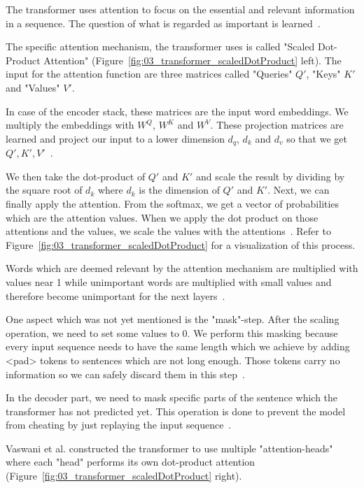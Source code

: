 The transformer uses attention to focus on the essential and relevant information in a sequence. The question of what is regarded as important is learned~\cite{Vaswani2017d}.

The specific attention mechanism, the transformer uses is called "Scaled Dot-Product Attention" {(Figure~\ref{fig:03_transformer_scaledDotProduct} left)}. The input for the attention function are three matrices called "Queries" $Q'$, "Keys" $K'$ and "Values" $V'$.

In case of the encoder stack, these matrices are the input word embeddings. We multiply the embeddings with $W^Q$, $W^K$ and $W^V$. These projection matrices are learned and project our input to a lower dimension $d_q$, $d_k$ and $d_v$ so that we get $Q', K', V'$~\cite{Vaswani2017d}.
\bigskip

We then take the dot-product of $Q'$ and $K'$ and scale the result by dividing by the square root of $d_k$ where $d_k$ is the dimension of $Q'$ and $K'$. Next, we can finally apply the attention. From the softmax, we get a vector of probabilities which are the attention values. When we apply the dot product on those attentions and the values, we scale the values with the attentions~\cite{Vaswani2017d}. Refer to Figure~\ref{fig:03_transformer_scaledDotProduct} for a visualization of this process.
\medskip

Words which are deemed relevant by the attention mechanism are multiplied with values near 1 while unimportant words are multiplied with small values and therefore become unimportant for the next layers~\cite{Vaswani2017d}.
\medskip

One aspect which was not yet mentioned is the "mask"-step. After the scaling operation, we need to set some values to 0. We perform this masking because every input sequence needs to have the same length which we achieve by adding <pad> tokens to sentences which are not long enough. Those tokens carry no information so we can safely discard them in this step~\cite{Vaswani2017d}. 

In the decoder part, we need to mask specific parts of the sentence which the transformer has not predicted yet. This operation is done to prevent the model from cheating by just replaying the input sequence~\cite{Vaswani2017d}.
\medskip

Vaswani et al. constructed the transformer to use multiple "attention-heads" where each "head" performs its own dot-product attention {(Figure~\ref{fig:03_transformer_scaledDotProduct} right)}. 

